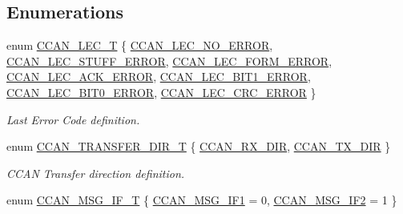 \subsection*{Enumerations}
\begin{DoxyCompactItemize}
\item 
enum \hyperlink{group___c_c_a_n__18_x_x__43_x_x_gad7a3e9e736dfb04f5faff4954a01591a}{C\+C\+A\+N\+\_\+\+L\+E\+C\+\_\+T} \{ \newline
\hyperlink{group___c_c_a_n__18_x_x__43_x_x_ggad7a3e9e736dfb04f5faff4954a01591aa0f85936863162c77305b1561506af2e4}{C\+C\+A\+N\+\_\+\+L\+E\+C\+\_\+\+N\+O\+\_\+\+E\+R\+R\+OR}, 
\hyperlink{group___c_c_a_n__18_x_x__43_x_x_ggad7a3e9e736dfb04f5faff4954a01591aa0f2bbf091c125bc5a3800089ce41d32f}{C\+C\+A\+N\+\_\+\+L\+E\+C\+\_\+\+S\+T\+U\+F\+F\+\_\+\+E\+R\+R\+OR}, 
\hyperlink{group___c_c_a_n__18_x_x__43_x_x_ggad7a3e9e736dfb04f5faff4954a01591aac23e3d0c0180164aa01c8058e682d95a}{C\+C\+A\+N\+\_\+\+L\+E\+C\+\_\+\+F\+O\+R\+M\+\_\+\+E\+R\+R\+OR}, 
\hyperlink{group___c_c_a_n__18_x_x__43_x_x_ggad7a3e9e736dfb04f5faff4954a01591aaaa28041d8c7ea3816e20198e56a91449}{C\+C\+A\+N\+\_\+\+L\+E\+C\+\_\+\+A\+C\+K\+\_\+\+E\+R\+R\+OR}, 
\newline
\hyperlink{group___c_c_a_n__18_x_x__43_x_x_ggad7a3e9e736dfb04f5faff4954a01591aa064ab8e719bb679a9be161469a1ef085}{C\+C\+A\+N\+\_\+\+L\+E\+C\+\_\+\+B\+I\+T1\+\_\+\+E\+R\+R\+OR}, 
\hyperlink{group___c_c_a_n__18_x_x__43_x_x_ggad7a3e9e736dfb04f5faff4954a01591aa123dfabe703e6396a0334598bcae266e}{C\+C\+A\+N\+\_\+\+L\+E\+C\+\_\+\+B\+I\+T0\+\_\+\+E\+R\+R\+OR}, 
\hyperlink{group___c_c_a_n__18_x_x__43_x_x_ggad7a3e9e736dfb04f5faff4954a01591aa9b75109a2824295f6739961e1b110367}{C\+C\+A\+N\+\_\+\+L\+E\+C\+\_\+\+C\+R\+C\+\_\+\+E\+R\+R\+OR}
 \}\begin{DoxyCompactList}\small\item\em Last Error Code definition. \end{DoxyCompactList}
\item 
enum \hyperlink{group___c_c_a_n__18_x_x__43_x_x_gac400be6c4ae22b8b773b0bea6e9c5f02}{C\+C\+A\+N\+\_\+\+T\+R\+A\+N\+S\+F\+E\+R\+\_\+\+D\+I\+R\+\_\+T} \{ \hyperlink{group___c_c_a_n__18_x_x__43_x_x_ggac400be6c4ae22b8b773b0bea6e9c5f02a20cb141be8468d07983601deedd9f726}{C\+C\+A\+N\+\_\+\+R\+X\+\_\+\+D\+IR}, 
\hyperlink{group___c_c_a_n__18_x_x__43_x_x_ggac400be6c4ae22b8b773b0bea6e9c5f02a03c25f707e2e0857392c2def9e8cef20}{C\+C\+A\+N\+\_\+\+T\+X\+\_\+\+D\+IR}
 \}\begin{DoxyCompactList}\small\item\em C\+C\+AN Transfer direction definition. \end{DoxyCompactList}
\item 
enum \hyperlink{group___c_c_a_n__18_x_x__43_x_x_gac90da0138c430750d2d7d55d4448cae7}{C\+C\+A\+N\+\_\+\+M\+S\+G\+\_\+\+I\+F\+\_\+T} \{ \hyperlink{group___c_c_a_n__18_x_x__43_x_x_ggac90da0138c430750d2d7d55d4448cae7aa0eb1a2b0eac4bdb8a9c8dba09d42b26}{C\+C\+A\+N\+\_\+\+M\+S\+G\+\_\+\+I\+F1} = 0, 
\hyperlink{group___c_c_a_n__18_x_x__43_x_x_ggac90da0138c430750d2d7d55d4448cae7a45267f491cc7247be1a624489ce31c2c}{C\+C\+A\+N\+\_\+\+M\+S\+G\+\_\+\+I\+F2} = 1
 \}
\end{DoxyCompactItemize}
